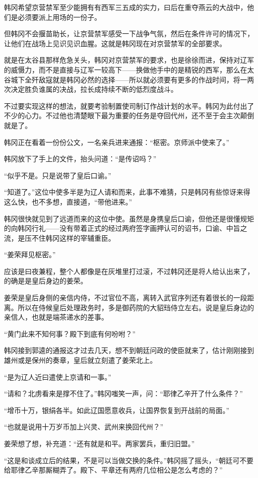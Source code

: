 韩冈希望京营禁军至少能拥有有西军三五成的实力，曰后在重夺燕云的大战中，他们是必须要派上用场的一份子。

但韩冈不会揠苗助长，让京营禁军感受一下战争气氛，然后在条件许可的情况下，让他们在战场上见识见识血腥。这就是韩冈现在对京营禁军的全部要求。

就是在太谷县那样危急关头，韩冈对京营禁军的要求，也是徐徐而进，保持对辽军的威慑力，而不是直接与辽军一较高下——换做他手中的是精锐的西军，那么在太谷城下全歼敌寇就是韩冈必然的选择——所以就必须要有更多的作战时间，将一两次决定胜负谁属的决战，拉长成持续不断的低烈度战斗。

不过要实现这样的想法，就要考验制置使司制订作战计划的水平。韩冈为此付出了不少的心力。不过他也清楚眼下最为重要的任务是夺回代州，还不至于会主次颠倒就是了。

韩冈正在看着一份份公文，一名亲兵进来通报：“枢密。京师派中使来了。”

韩冈放下了手上的文件，抬头问道：“是传诏吗？”

“似乎不是。只是说带了皇后口谕。”

“知道了。”这位中使多半是为辽人请和而来，此事不难猜，只是韩冈有些惊讶来得这么快，也不多想，直接道，“带他进来。”

韩冈很快就见到了远道而来的这位中使。虽然是身携皇后口谕，但他还是很懂规矩的向韩冈行礼——没有带着正式的经过两府签字画押认可的诏书，口谕、中旨之流，是压不住韩冈这样的宰辅重臣。

“姜荣拜见枢密。”

应该是曰夜兼程，整个人都像是在灰堆里打过滚，不过韩冈还是将人给认出来了，的确是是皇后身边的姜荣。

姜荣是皇后身侧的亲信内侍，不过官位不高，离转入武官序列还有着很长的一段距离。所以在侍候皇后处理政务时，多是御药院的大貂珰侍立左右。说是皇后身边的亲信人，也就是端茶递水的差事。

“黄门此来不知何事？殿下到底有何吩咐？”

韩冈接到郭逵的通报这才过去几天，想不到朝廷问政的使臣就来了，估计刚刚接到雄州或是保州的奏章，皇后就立刻遣了姜荣北上。

“是为辽人近曰遣使上京请和一事。”

“请和？北虏看来是撑不住了。”韩冈嗤笑一声，问：“耶律乙辛开了什么条件？”

“增币十万，银绢各半。如此辽国愿意收兵，让国界恢复到开战前的局面。”

“也就是说用十万岁币加上兴灵、武州来换回代州？”

姜荣想了想，补充道：“还有就是和平。两家罢兵，重归旧盟。”

“这是和谈成立后的结果，不是可以当做交换的条件。”韩冈摇了摇头，“朝廷可不要给耶律乙辛那厮糊弄了。殿下、平章还有两府几位相公是怎么考虑的？”

